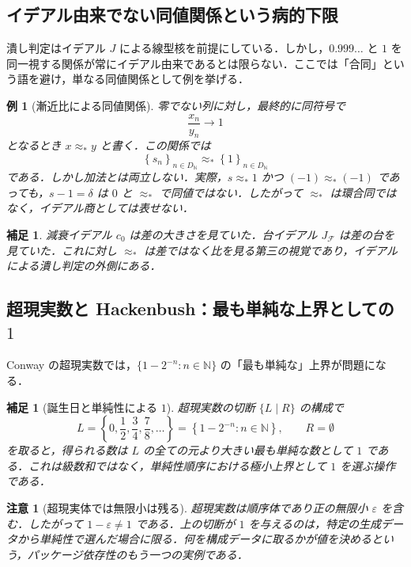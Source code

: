 \documentclass[a4paper,11pt]{ltjsarticle}
\theoremstyle{jpdef}
\newtheorem{remark}[definition]{補足}
\newtheorem{warning}[definition]{注意}
\newtheorem{example}[definition]{例}
\theoremstyle{jpthm}
\newcommand{\N}{\mathbb{N}}
\newcommand{\DN}{D_{\N}}
\newcommand{\set}[1]{\left\{#1\right\}}
\newcommand{\seq}[2]{\left\{#1\right\}_{#2}}
\newcommand{\eps}{\varepsilon}
\begin{document}
\subsection{イデアル由来でない同値関係という病的下限}

潰し判定はイデアル \(J\) による線型核を前提にしている．しかし，\(0.999\ldots\) と \(1\) を同一視する関係が常にイデアル由来であるとは限らない．ここでは「合同」という語を避け，単なる同値関係として例を挙げる．

\begin{example}[漸近比による同値関係]
零でない列に対し，最終的に同符号で
\[
  \frac{x_n}{y_n}\longrightarrow1
\]
となるとき \(x\approx_* y\) と書く．この関係では
\[
  \seq{s_n}{n\in\DN}\approx_*\seq{1}{n\in\DN}
\]
である．しかし加法とは両立しない．実際，\(s\approx_*1\) かつ \((-1)\approx_*(-1)\) であっても，\(s-1=\delta\) は \(0\) と \(\approx_*\) で同値ではない．したがって \(\approx_*\) は環合同ではなく，イデアル商としては表せない．
\end{example}

\begin{remark}
減衰イデアル \(c_0\) は差の大きさを見ていた．台イデアル \(J_{\mathcal F}\) は差の台を見ていた．これに対し \(\approx_*\) は差ではなく比を見る第三の視覚であり，イデアルによる潰し判定の外側にある．
\end{remark}

\subsection{超現実数と Hackenbush：最も単純な上界としての \(1\)}

Conway の超現実数では，\(\{1-2^{-n}:n\in\N\}\) の「最も単純な」上界が問題になる．

\begin{remark}[誕生日と単純性による \(1\)]
超現実数の切断 \(\{L\mid R\}\) の構成で
\[
  L=\set{0,\frac12,\frac34,\frac78,\ldots}=\set{1-2^{-n}:n\in\N},
  \qquad
  R=\emptyset
\]
を取ると，得られる数は \(L\) の全ての元より大きい最も単純な数として \(1\) である．これは級数和ではなく，単純性順序における極小上界として \(1\) を選ぶ操作である．
\end{remark}

\begin{warning}[超現実体では無限小は残る]
超現実数は順序体であり正の無限小 \(\eps\) を含む．したがって \(1-\eps\ne1\) である．上の切断が \(1\) を与えるのは，特定の生成データから単純性で選んだ場合に限る．何を構成データに取るかが値を決めるという，パッケージ依存性のもう一つの実例である．
\end{warning}
\end{document}
